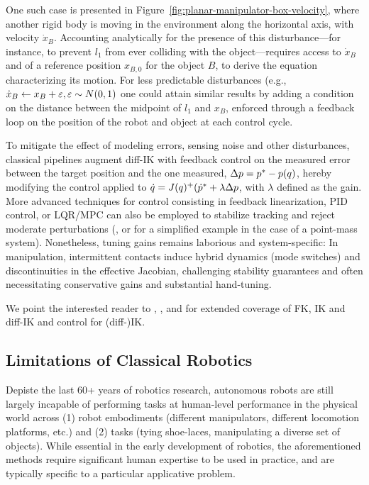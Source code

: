One such case is presented in Figure~\ref{fig:planar-manipulator-box-velocity}, where another rigid body is moving in the environment along the horizontal axis, with velocity \( \dot x_B \).
Accounting analytically for the presence of this disturbance---for instance, to prevent \( l_1 \) from ever colliding with the object---requires access to \( \dot x_B \) and of a reference position \( x_{B,0} \) for the object \( B \), to derive the equation characterizing its motion.
For less predictable disturbances (e.g., \( \dot x_B \leftarrow x_B + {\varepsilon}, {\varepsilon} \sim N(0,1) \) one could attain similar results by adding a condition on the distance between the midpoint of \( l_1 \) and \( x_B \), enforced through a feedback loop on the position of the robot and object at each control cycle.

To mitigate the effect of modeling errors, sensing noise and other disturbances, classical pipelines augment diff-IK with feedback control on the measured error between the target position and the one measured, \( \Delta p = p^* - p(q) \), hereby modifying the control applied to \( \dot q = J(q)^+ (\dot {p}^* + \lambda \Delta p \), with \( \lambda \) defined as the gain.
More advanced techniques for control consisting in feedback linearization, PID control, or LQR/MPC can also be employed to stabilize tracking and reject moderate perturbations (\cite[Chapter~8]{sicilianoSpringerHandbookRobotics2016}, or \cite[Chapter~8]{tedrakeRoboticManipulationPerception} for a simplified example in the case of a point-mass system).
Nonetheless, tuning gains remains laborious and system-specific: In manipulation, intermittent contacts induce hybrid dynamics (mode switches) and discontinuities in the effective Jacobian, challenging stability guarantees and often necessitating conservative gains and substantial hand-tuning.

We point the interested reader to \cite[Chapter~2,7,8]{sicilianoSpringerHandbookRobotics2016}, \cite[Chapter~6,11]{lynchModernRoboticsMechanics2017}, and \cite[Chapter~3,8]{tedrakeRoboticManipulationPerception} for extended coverage of FK, IK and diff-IK and control for (diff-)IK.

\subsection{Limitations of Classical Robotics}
Depiste the last 60+ years of robotics research, autonomous robots are still largely incapable of performing tasks at human-level performance in the physical world across (1) robot embodiments (different manipulators, different locomotion platforms, etc.) and (2) tasks (tying shoe-laces, manipulating a diverse set of objects).
While essential in the early development of robotics, the aforementioned methods require significant human expertise to be used in practice, and are typically specific to a particular applicative problem. 

